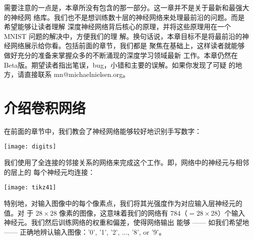 需要注意的一点是，本章所没有包含的那一部分。这一章并不是关于最新和最强大的神经网
络库。我们也不是想训练数十层的神经网络来处理最前沿的问题。而是希望能够让读者理解
深度神经网络背后核心的原理，并将这些原理用在一个 MNIST 问题的解决中，方便我们的理
解。换句话说，本章目标不是将最前沿的神经网络展示给你看。包括前面的章节，我们都是
聚焦在基础上，这样读者就能够做好充分的准备来掌握众多的不断涌现的深度学习领域最新
工作。本章仍然在Beta版。期望读者指出笔误，bug，小错和主要的误解。如果你发现了可疑
的地方，请直接联系 mn@michaelnielsen.org。

\section{介绍卷积网络}
\label{sec:convolutional_networks}

在前面的章节中，我们教会了神经网络能够较好地识别手写数字：
\begin{center}
  \texttt{[image: digits]}
\end{center}

我们使用了全连接的邻接关系的网络来完成这个工作。即，网络中的神经元与相邻的层上的
每个神经元均连接：
\begin{center}
  \texttt{[image: tikz41]}
\end{center}

特别地，对输入图像中的每个像素点，我们将其光强度作为对应输入层神经元的值。对
于 $28 \times 28$ 像素的图像，这意味着我们的网络有
$784$（$= 28 \times 28$）个输入神经元。我们然后训练网络的权重和偏差，使得网络输出
能够 —— 如我们希望地 —— 正确地辨认输入图像：'0', '1', '2', ..., '8', or '9'。

